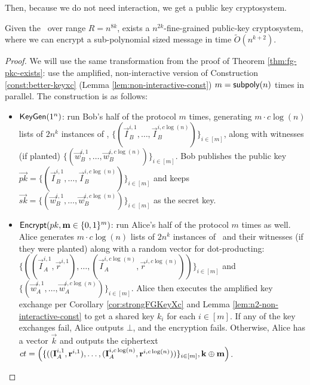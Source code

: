 Then, because we do not need interaction, we get a public key cryptosystem.
\begin{corollary}
	Given the \strongzkc~over range $R = n^{8k}$, exists a $n^{2k}$-fine-grained public-key cryptosystem, where we can encrypt a sub-polynomial sized message in time $\tilde{O}\left(n^{k + 2}\right)$.
	\label{cor:n2-pkc}
\end{corollary}
\begin{proof}
	We will use the same transformation from the proof of Theorem \ref{thm:fg-pkc-exists}: use the amplified, non-interactive version of Construction \ref{const:better-keyxc} (Lemma \ref{lem:non-interactive-const}) $m = \mathsf{subpoly}(n)$ times in parallel. The construction is as follows:
	\begin{itemize}
		\item $\textsf{KeyGen}(1^n)$: run Bob's half of the protocol $m$ times, generating $m \cdot c\log(n)$ lists of $2n^k$ instances of \zkclique, $\{(\vec I_B^{i,1}, \ldots, \vec I_B^{i,c\log(n)})\}_{i \in [m]}$, along with witnesses (if planted) $\{(\vec w_B^{i, 1}, \ldots, \vec w_B^{i, c\log(n)})\}_{i \in [m]}$. Bob publishes the public key $\vec{pk} = \{(\vec I_B^{i,1}, \ldots, \vec I_B^{i,c\log(n)})\}_{i \in [m]}$ and keeps $\vec{sk} = \{(\vec w_B^{i, 1}, \ldots, \vec w_B^{i, c\log(n)})\}_{i \in [m]}$ as the secret key.
		
		\item $\textsf{Encrypt}(pk, \mathbf m \in \{0,1\}^m)$: run Alice's half of the protocol $m$ times as well. Alice generates $m \cdot c \log(n)$ lists of $2n^k$ instances of \zkclique~and their witnesses (if they were planted) along with a random vector for dot-producting: $\{((\vec I_A^{i,1}, \vec r^{i, 1}), \ldots, (\vec I_A^{i,c\log(n)}, \vec r^{i, c \log(n)}))\}_{i \in [m]}$ and $\{(\vec w_A^{i, 1}, \ldots, \vec w_A^{i, c\log(n)})\}_{i \in [m]}$. Alice then executes the amplified key exchange per Corollary \ref{cor:strongFGKeyXc} and Lemma \ref{lem:n2-non-interactive-const} to get a shared key $k_i$ for each $i \in [m]$. If any of the key exchanges fail, Alice outputs $\bot$, and the encryption fails. Otherwise, Alice has a vector $\vec k$ and outputs the ciphertext $ct = \left( \{((\mathbf I_A^{i,1}, \mathbf r^{i, 1}), \ldots, (\mathbf I_A^{i,c\log(n)}, \mathbf r^{i, c \log(n)}))\}_{i \in [m]}, \mathbf k \oplus \mathbf m \right)$.
		

\end{itemize}
\end{proof}
